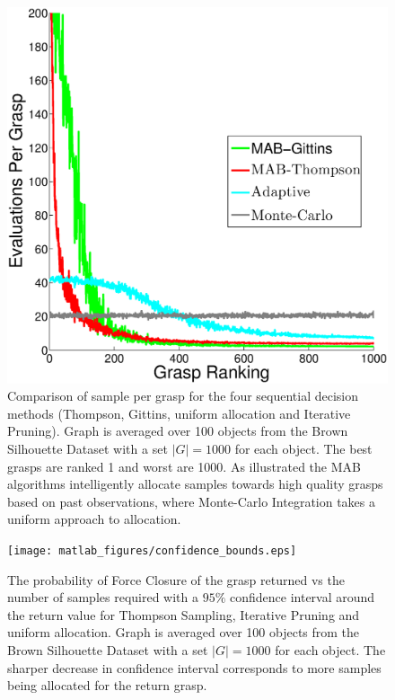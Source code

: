 \documentclass[10pt, conference]{ieeeconf}      %
\begin{document}
\begin{figure}[t!]
\centering
\includegraphics[scale=0.25]{matlab_figures/pulls_per_grasp.eps}
\caption{ \footnotesize Comparison of sample per grasp for the four sequential decision methods (Thompson, Gittins, uniform allocation and Iterative Pruning). Graph is averaged over 100 objects from the Brown Silhouette Dataset \cite{brown} with a set $|G|=1000$ for each object. The best grasps are ranked 1 and worst are 1000. As illustrated the MAB algorithms intelligently allocate samples towards high quality grasps based on past observations, where Monte-Carlo Integration takes a uniform approach to allocation. }

\vspace*{-10pt}
\label{fig:pulls_per_grasp}
\end{figure}

\begin{figure}[t!]
\centering
\texttt{[image: matlab\_figures/confidence\_bounds.eps]}
\caption{ \footnotesize {} The probability of Force Closure of the grasp returned vs the number of samples required with a $95\%$ confidence interval around the return value for Thompson Sampling, Iterative Pruning and uniform allocation. Graph is averaged over 100 objects from the Brown Silhouette Dataset \cite{brown} with a set $|G|=1000$ for each object. The sharper decrease in confidence interval corresponds to more samples being allocated for the return grasp. }

\vspace*{-10pt}
\label{fig:confidence}
\end{figure}
\end{document}
